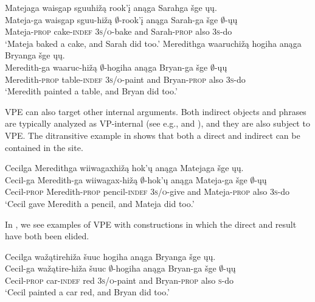 \documentclass[output=paper]{LSP/langsci}
\begin{document}
\ea\label{ex:johnson:4}
\ea\label{ex:johnson:4a} 
\glll Matejaga {\ob}{\sVP} {waisgap sguuhižą} rook'į{\cb} anąga Sarahga šge {\ob}ųų{\cb}.\\
Mateja-ga {} {waisgap sguu-hižą} $\emptyset$-rook'į anąga Sarah-ga šge {\db}$\emptyset$-ųų\\
Mateja-\textsc{prop} {} cake-\textsc{indef} \textsc{3s/o}-bake and Sarah-\textsc{prop} also {\db}\textsc{3s}-do\\
\trans `Mateja baked a cake, and Sarah did too.' 
\ex\label{ex:johnson:4b} 
\glll Meredithga {\ob}{\sVP} waaruchižą hogiha{\cb} anąga Bryanga šge {\ob}ųų{\cb}.\\
Meredith-ga {} waaruc-hižą $\emptyset$-hogiha anąga Bryan-ga šge {\db}$\emptyset$-ųų\\
Meredith-\textsc{prop} {} table-\textsc{indef} \textsc{3s/o}-paint and Bryan-\textsc{prop} also {\db}\textsc{3s}-do\\
\trans `Meredith painted a table, and Bryan did too.'
\z
\z

VPE can also target other internal arguments. Both indirect objects and  phrases are typically analyzed as VP-internal (see e.g., \citealt{Larson1988} and \citealt{LevinRappaportHovav1995}), and they are also subject to VPE. The ditransitive example in  shows that both a direct  and indirect  can be contained in the  site.

 
\ea\label{ex:johnson:5} 
\glll Cecilga {\ob}{\sVP} Meredithga wiiwagaxhižą hok'ų{\cb} anąga Matejaga šge {\ob}ųų{\cb}.\\
Cecil-ga {} Meredith-ga wiiwagax-hižą $\emptyset$-hok'ų anąga Mateja-ga šge {\db}$\emptyset$-ųų\\
Cecil-\textsc{prop} {} Meredith-\textsc{prop} pencil-\textsc{indef} \textsc{3s/o}-give and Mateja-\textsc{prop} also {\db}\textsc{3s}-do\\
\trans `Cecil gave Meredith a pencil, and Mateja did too.'
\z

In , we see examples of VPE with  constructions in which the direct  and result have both been elided. 
 
\ea\label{ex:johnson:6}
\ea\label{ex:johnson:6a} 
\glll Cecilga  {\ob}{\sVP} wažątirehiža šuuc hogiha{\cb} anąga Bryanga šge {\ob}ųų{\cb}.\\
Cecil-ga {} wažątire-hiža šuuc $\emptyset$-hogiha anąga Bryan-ga šge {\db}$\emptyset$-ųų\\
Cecil-\textsc{prop} {} car-\textsc{indef} red \textsc{3s/o}-paint and Bryan-\textsc{prop} also \textsc {s}-do\\
\trans `Cecil painted a car red, and Bryan did too.'
 
\end{document}

